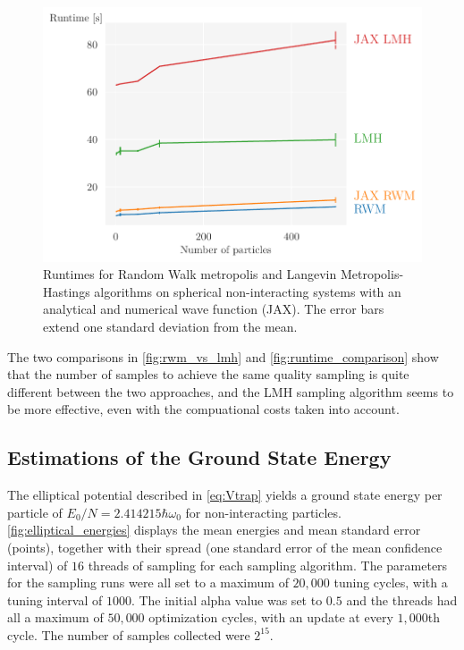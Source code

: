\begin{figure}[!htb]
\begin{center}\includegraphics[width=\textwidth]{latex/figures/runtime_comparisons.pdf}
\end{center}
\caption{Runtimes for Random Walk metropolis and Langevin Metropolis-Hastings algorithms on spherical non-interacting systems with an analytical and numerical wave function (JAX). The error bars extend one standard deviation from the mean.}
\label{fig:runtime_comparison}
\end{figure}


The two comparisons in \autoref{fig:rwm_vs_lmh} and \autoref{fig:runtime_comparison} show that the number of samples to achieve the same quality sampling is quite different between the two approaches, and the LMH sampling algorithm seems to be more effective, even with the compuational costs taken into account. 


\FloatBarrier

\subsection{Estimations of the Ground State Energy}


The elliptical potential described in \autoref{eq:Vtrap} yields a ground state energy per particle of $E_0/N = 2.414215 \hbar\omega_0$ for non-interacting particles. \autoref{fig:elliptical_energies} displays the mean energies and mean standard error (points), together with their spread (one standard error of the mean confidence interval)  of $16$ threads of sampling for each sampling algorithm. The parameters for the sampling runs were all set to a maximum of $20,000$ tuning cycles, with a tuning interval of $1000$. The initial alpha value was set to $0.5$ and the threads had all a maximum of $50,000$ optimization cycles, with an update at every $1,000$th cycle. The number of samples collected were $2^{15}$. 

